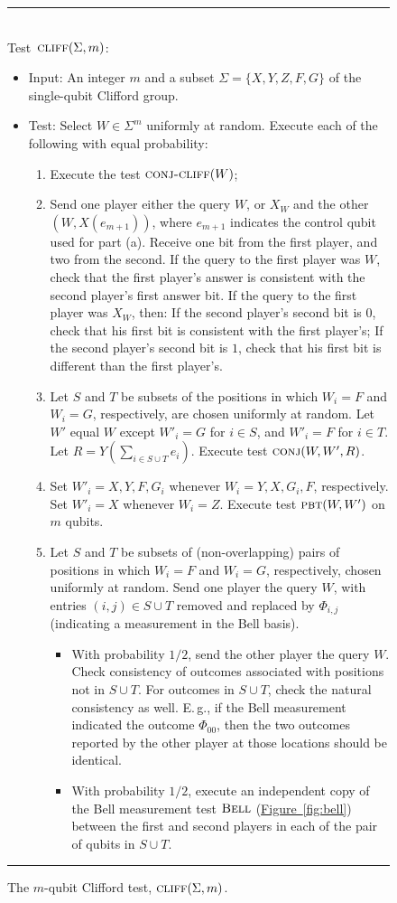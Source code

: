 \documentclass[11pt]{article}
\numberwithin{equation}{section}
\theoremstyle{definition}
\theoremstyle{plain}
\newcommand{\Eg}{E.\,g.}
\newcommand{\expref}[2]{\hyperref[#2]{#1~\ref{#2}}}
\newcommand{\pbt}{\textsc{pbt}}
\newcommand{\conj}{\textsc{conj}}
\newcommand{\bellt}{\textsc{Bell}}
\newcommand{\conjc}{\textsc{conj-cliff}}
\newcommand{\cliff}{\textsc{cliff}}
\begin{document}
\begin{figure}[H]
\rule[1ex]{\textwidth}{0.5pt}\\
Test~$\cliff(\Sigma,m)$:
\begin{itemize}
    \item Input: An integer $m$ and a subset $\Sigma = \{X,Y,Z,F,G\}$ of the single-qubit Clifford group. 
    \item Test: Select $W \in \Sigma^m$ uniformly at random. Execute each of the following with equal probability:
\begin{enumerate}
\item[(a)] Execute the test $\conjc(W)$;
\item[(b)] Send one player either the query $W$, or $X_W$ and the other $(W,X(e_{m+1}))$, where $e_{m+1}$ indicates the control qubit used for part (a). Receive one bit from the first player, and two from the second. If the query to the first player was $W$, check that the first player's answer is consistent with the second player's first answer bit. If the query to the first player was $X_W$, then: If the second player's second bit is $0$, check that his first bit is consistent with the first player's; If the second player's second bit is $1$, check that his first bit is different than the first player's.
\item[(c)] Let $S$ and $T$ be subsets of the positions in which $W_i=F$ and $W_i=G$, %
 respectively,
are %
chosen uniformly at random. Let $W'$ equal $W$ except $W'_i=G$ for $i\in S$, and $W'_i=F$ for $i\in T$. Let  $R = Y(\sum_{i\in S\cup T} e_i)$. Execute test $\conj(W,W', R)$.
\item[(d)] %
%
%
Set $W'_i = X, Y, F, G_i$ whenever $W_i = Y, X, G_i, F$, respectively.
%
%
Set $W'_i = X$ whenever $W_i=Z$. Execute test $\pbt(W,W')$ on $m$ qubits.

\item[(e)] Let $S$ and $T$ be subsets of (non-overlapping) pairs of positions in which $W_i=F$ and $W_i=G$, %
 respectively, chosen uniformly at random. Send one player the query $W$, with entries $(i,j) \in S\cup T$ removed and replaced by $\Phi_{i,j}$ (indicating a measurement in the Bell basis). 
\begin{itemize}
\item With probability $1/2$, send the other player the query $W$. Check consistency of outcomes associated with positions not in $S\cup T$. For outcomes in $S\cup T$, check the natural consistency as 
%
%
well. \Eg,
if the Bell measurement indicated the outcome $\Phi_{00}$, then the two outcomes reported by the other player at those locations should be identical. 
\item With probability $1/2$, execute an independent copy of the Bell measurement test $\bellt$ (\expref{Figure}{fig:bell}) between the first and second players in each of the pair of qubits in $S\cup T$. 
\end{itemize}
\end{enumerate}
\end{itemize}
\rule[2ex]{\textwidth}{0.5pt}\vspace{-.5cm}
\caption{The $m$-qubit Clifford test, $\cliff(\Sigma,m)$.}
\label{fig:clifford-test-3}
\end{figure}
\end{document}
